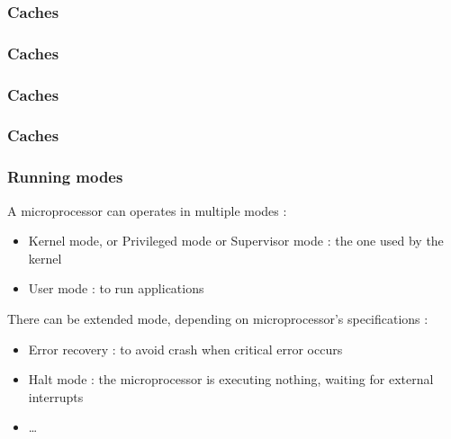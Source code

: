 
\begin{frame}
  \frametitle{Caches}

  \begin{center}
  \end{center}

\end{frame}


\begin{frame}
  \frametitle{Caches}

  \begin{center}
  \end{center}

\end{frame}


\begin{frame}
  \frametitle{Caches}

  \begin{center}
  \end{center}

\end{frame}


\begin{frame}
  \frametitle{Caches}

  \begin{center}
  \end{center}

\end{frame}


\begin{frame}
  \frametitle{Running modes}

  A microprocessor can operates in multiple modes :

  \begin{itemize}
  \item
    Kernel mode, or Privileged mode or Supervisor mode : the one used by the kernel
  \item
    User mode : to run applications
  \end{itemize}

  There can be extended mode, depending on microprocessor's
  specifications :

  \begin{itemize}
  \item
    Error recovery : to avoid crash when critical error occurs
  \item
    Halt mode : the microprocessor is executing nothing, waiting for external interrupts
  \item
    \ldots
  \end{itemize}

\end{frame}

